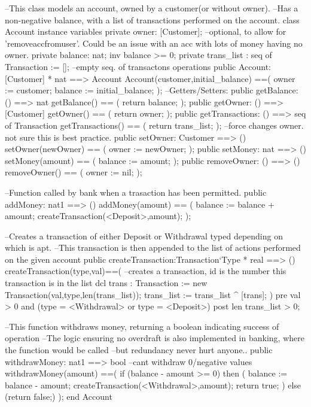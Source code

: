 \documentclass[a4paper]{article}
\begin{document}
\title{}
\author{}
\begin{vdm_al}
--This class models an account, owned by a customer(or without owner).
--Has a non-negative balance, with a list of transactions performed on the account. 
class Account
instance variables
    private owner: [Customer]; --optional, to allow for 'removeaccfromuser'. Could be an issue with an acc with lots of money having no owner. 
    private balance: nat;
    inv balance >= 0; 
    private trans_list : seq of Transaction := []; --empty seq. of transactons
operations
    public Account: [Customer] * nat ==> Account
    Account(customer,initial_balance) ==(
        owner := customer;
        balance := initial_balance;
    );
    --Getters/Setters:
    public getBalance: () ==> nat
    getBalance() == (
        return balance;
    );
    public getOwner: () ==> [Customer]
    getOwner() == (
        return owner;
    );
    public getTransactions: () ==> seq of Transaction
    getTransactions() == (
        return trans_list;
    );
    --force changes owner. not sure this is best practice. 
    public setOwner: Customer ==> ()
    setOwner(newOwner) == (
        owner := newOwner;
    );
    public setMoney: nat ==> ()
    setMoney(amount) == (
        balance := amount;
    );
    public removeOwner: () ==> ()
    removeOwner() == (
        owner := nil;
    );

    --Function called by bank when a trasaction has been permitted. 
    public addMoney: nat1 ==> ()
    addMoney(amount) == (
        balance := balance + amount;
        createTransaction(<Deposit>,amount);
    );
    
    --Creates a transaction of either Deposit or Withdrawal typed depending on which is apt. 
    --This transaction is then appended to the list of actions performed on the given account
    public createTransaction:Transaction`Type * real ==> ()
    createTransaction(type,val)==(
        --creates a transaction, id is the number this transaction is in the list
        dcl trans : Transaction := new Transaction(val,type,len(trans_list));
        trans_list := trans_list ^ [trans];
    )
    pre val > 0 and (type = <Withdrawal> or type = <Deposit>)
    post len trans_list > 0;

    --This function withdraws money, returning a boolean indicating success of operation
    --The logic ensuring no overdraft is also implemented in banking, where the function would be called
    --but redundancy never hurt anyone..
    public withdrawMoney: nat1 ==> bool   --cant withdraw 0/negative values
    withdrawMoney(amount) ==(
        if (balance - amount >= 0) then (
            balance := balance - amount;
            createTransaction(<Withdrawal>,amount);
            return true;
        )
        else (return false;)
    );
end Account
\end{vdm_al}
\end{document}
